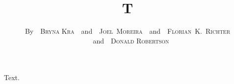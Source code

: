 \documentclass{article}
\title{T}
\author{By~~{\scshape Bryna Kra}~~and~~{\scshape Joel~Moreira}~~and~~{\scshape Florian~K.~Richter}\\~~and~~{\scshape Donald Robertson}}
\begin{document}
\maketitle
Text.
\end{document}
